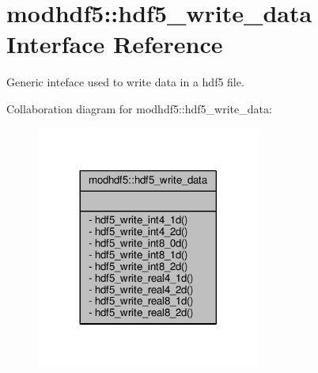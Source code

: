 \hypertarget{interfacemodhdf5_1_1hdf5__write__data}{}\section{modhdf5\+:\+:hdf5\+\_\+write\+\_\+data Interface Reference}
\label{interfacemodhdf5_1_1hdf5__write__data}


Generic inteface used to write data in a hdf5 file.  




Collaboration diagram for modhdf5\+:\+:hdf5\+\_\+write\+\_\+data\+:\nopagebreak
\begin{figure}[H]
\begin{center}
\leavevmode
\includegraphics[width=209pt]{interfacemodhdf5_1_1hdf5__write__data__coll__graph}
\end{center}
\end{figure}

